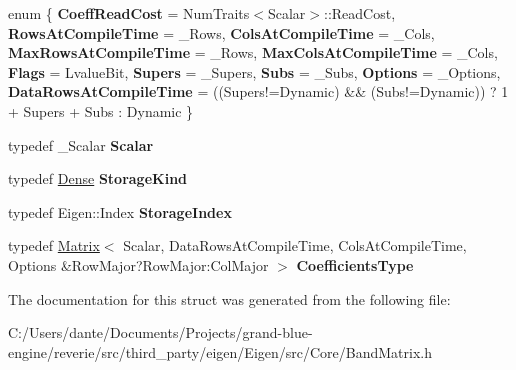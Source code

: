 \begin{DoxyCompactItemize}
\item 
\mbox{\label{struct_eigen_1_1internal_1_1traits_3_01_band_matrix_3_01___scalar_00_01___rows_00_01___cols_00_03762db5085b3b9896d5a124beda4837b_ac0e2024a4daee7e626c76648033d0157}} 
enum \{ \newline
{\bfseries Coeff\+Read\+Cost} = Num\+Traits$<$Scalar$>$\+::Read\+Cost, 
{\bfseries Rows\+At\+Compile\+Time} = \+\_\+\+Rows, 
{\bfseries Cols\+At\+Compile\+Time} = \+\_\+\+Cols, 
{\bfseries Max\+Rows\+At\+Compile\+Time} = \+\_\+\+Rows, 
\newline
{\bfseries Max\+Cols\+At\+Compile\+Time} = \+\_\+\+Cols, 
{\bfseries Flags} = Lvalue\+Bit, 
{\bfseries Supers} = \+\_\+\+Supers, 
{\bfseries Subs} = \+\_\+\+Subs, 
\newline
{\bfseries Options} = \+\_\+\+Options, 
{\bfseries Data\+Rows\+At\+Compile\+Time} = ((Supers!=Dynamic) \&\& (Subs!=Dynamic)) ? 1 + Supers + Subs \+: Dynamic
 \}
\item 
\mbox{\label{struct_eigen_1_1internal_1_1traits_3_01_band_matrix_3_01___scalar_00_01___rows_00_01___cols_00_03762db5085b3b9896d5a124beda4837b_a7491ccd4fec074ebedf02909f324b36a}} 
typedef \+\_\+\+Scalar {\bfseries Scalar}
\item 
\mbox{\label{struct_eigen_1_1internal_1_1traits_3_01_band_matrix_3_01___scalar_00_01___rows_00_01___cols_00_03762db5085b3b9896d5a124beda4837b_add341ed484b43c00348eeab9dc99d0d8}} 
typedef \mbox{\hyperlink{struct_eigen_1_1_dense}{Dense}} {\bfseries Storage\+Kind}
\item 
\mbox{\label{struct_eigen_1_1internal_1_1traits_3_01_band_matrix_3_01___scalar_00_01___rows_00_01___cols_00_03762db5085b3b9896d5a124beda4837b_a7cde578b2a145709789123f8922b66fa}} 
typedef Eigen\+::\+Index {\bfseries Storage\+Index}
\item 
\mbox{\label{struct_eigen_1_1internal_1_1traits_3_01_band_matrix_3_01___scalar_00_01___rows_00_01___cols_00_03762db5085b3b9896d5a124beda4837b_aafd270c1440909d8c2c7901e57e73f9e}} 
typedef \mbox{\hyperlink{class_eigen_1_1_matrix}{Matrix}}$<$ Scalar, Data\+Rows\+At\+Compile\+Time, Cols\+At\+Compile\+Time, Options \&Row\+Major?Row\+Major\+:\+Col\+Major $>$ {\bfseries Coefficients\+Type}
\end{DoxyCompactItemize}


The documentation for this struct was generated from the following file\+:\begin{DoxyCompactItemize}
\item 
C\+:/\+Users/dante/\+Documents/\+Projects/grand-\/blue-\/engine/reverie/src/third\+\_\+party/eigen/\+Eigen/src/\+Core/Band\+Matrix.\+h\end{DoxyCompactItemize}
